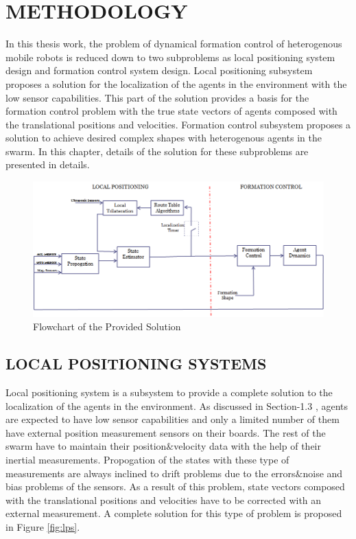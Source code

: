 

\chapter{METHODOLOGY}
\label{chp:Methodology}





In this thesis work, the problem of dynamical formation control of heterogenous mobile robots is reduced down to two subproblems as local positioning system design and formation control system design. Local positioning subsystem proposes  a  solution for the localization of the agents in the environment with the low sensor capabilities. This part of the solution provides a basis for the formation control problem with the true state vectors of agents composed with the translational positions and velocities. Formation control subsystem proposes a solution to achieve desired complex shapes with heterogenous agents in the swarm.  In this chapter, details of the solution for these subproblems are presented in details. 

\begin{figure}[H]
\caption{Flowchart of the Provided Solution}
\centering
\includegraphics[scale = 0.65]{general_scheme}
\end{figure}

\section{LOCAL POSITIONING SYSTEMS}
Local positioning system is a subsystem to provide a complete solution to the localization of the agents in the environment. As discussed in Section-1.3 , agents are expected to have low sensor capabilities and only a limited number of them have external position measurement sensors on their boards. The rest of the swarm have to maintain their position$\&$velocity data with the help of their inertial measurements. Propogation of the states with these type of measurements are always inclined to drift problems due to the errors$\&$noise and bias problems of the sensors. As a result of this problem, state vectors composed with the translational positions and velocities have to be corrected with an external measurement. A complete solution for this type of problem is proposed in Figure \ref{fig:lps}.

